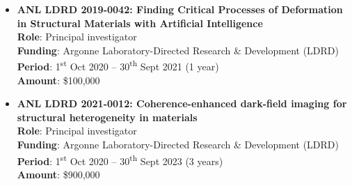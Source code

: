 \documentclass[11pt]{article}
\begin{document}
\begin{itemize}
    \item \textbf{ANL LDRD 2019-0042: Finding Critical Processes of Deformation in Structural Materials with Artificial Intelligence}\\
        \textbf{Role}: Principal investigator \\
        \textbf{Funding}: Argonne Laboratory-Directed Research \& Development (LDRD) \\
        \textbf{Period}: 1\textsuperscript{st} Oct 2020 -- 30\textsuperscript{th} Sept 2021 (1 year) \\
        \textbf{Amount}: \$100,000
    \item \textbf{ANL LDRD 2021-0012: Coherence-enhanced dark-field imaging for structural heterogeneity in materials}\\
        \textbf{Role}: Principal investigator \\
        \textbf{Funding}: Argonne Laboratory-Directed Research \& Development (LDRD) \\
        \textbf{Period}: 1\textsuperscript{st} Oct 2020 -- 30\textsuperscript{th} Sept 2023 (3 years) \\
        \textbf{Amount}: \$900,000
\end{itemize} 
\end{document}
